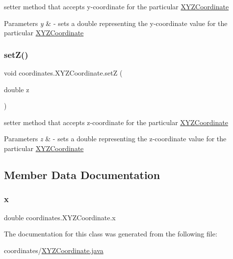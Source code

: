 setter method that accepts y-\/coordinate for the particular \hyperlink{classcoordinates_1_1_x_y_z_coordinate}{X\+Y\+Z\+Coordinate} 


\begin{DoxyParams}{Parameters}
{\em y} & -\/ sets a double representing the y-\/coordinate value for the particular \hyperlink{classcoordinates_1_1_x_y_z_coordinate}{X\+Y\+Z\+Coordinate} \\
\hline
\end{DoxyParams}
\mbox{\label{classcoordinates_1_1_x_y_z_coordinate_a0e32806c394f28e22238765c2fde9eee}} 
\subsubsection{\texorpdfstring{set\+Z()}{setZ()}}
{\footnotesize\ttfamily void coordinates.\+X\+Y\+Z\+Coordinate.\+setZ (\begin{DoxyParamCaption}\item[{double}]{z }\end{DoxyParamCaption})}



setter method that accepts z-\/coordinate for the particular \hyperlink{classcoordinates_1_1_x_y_z_coordinate}{X\+Y\+Z\+Coordinate} 


\begin{DoxyParams}{Parameters}
{\em z} & -\/ sets a double representing the z-\/coordinate value for the particular \hyperlink{classcoordinates_1_1_x_y_z_coordinate}{X\+Y\+Z\+Coordinate} \\
\hline
\end{DoxyParams}


\subsection{Member Data Documentation}
\mbox{\label{classcoordinates_1_1_x_y_z_coordinate_a93f191f410b19d99a71d3c66ef27df29}} 
\subsubsection{\texorpdfstring{x}{x}}
{\footnotesize\ttfamily double coordinates.\+X\+Y\+Z\+Coordinate.\+x\hspace{0.3cm}{\ttfamily [private]}}



The documentation for this class was generated from the following file\+:\begin{DoxyCompactItemize}
\item 
coordinates/\hyperlink{_x_y_z_coordinate_8java}{X\+Y\+Z\+Coordinate.\+java}\end{DoxyCompactItemize}
